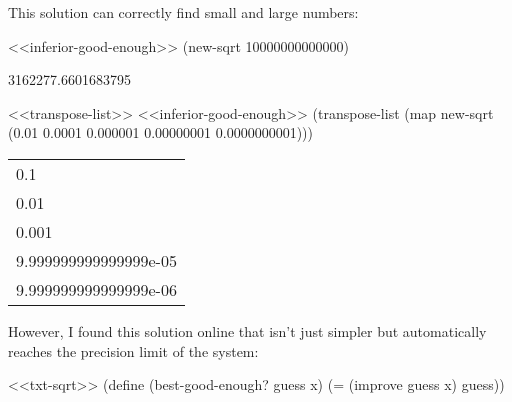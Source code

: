 \documentclass[
]{article}
\newenvironment{Shaded}{}{}
\newcommand{\DecValTok}[1]{\textcolor[rgb]{0.25,0.63,0.44}{#1}}
\newcommand{\ExtensionTok}[1]{#1}
\newcommand{\FloatTok}[1]{\textcolor[rgb]{0.25,0.63,0.44}{#1}}
\newcommand{\FunctionTok}[1]{\textcolor[rgb]{0.02,0.16,0.49}{#1}}
\newcommand{\NormalTok}[1]{#1}
\newcommand{\OperatorTok}[1]{\textcolor[rgb]{0.40,0.40,0.40}{#1}}
\begin{document}
This solution can correctly find small and large numbers:

\begin{Shaded}
\begin{Highlighting}[]
\NormalTok{\textless{}\textless{}inferior{-}good{-}enough\textgreater{}\textgreater{}}
\NormalTok{(new{-}sqrt }\DecValTok{10000000000000}\NormalTok{)}
\end{Highlighting}
\end{Shaded}

3162277.6601683795

\hypertarget{EX1-7-t2}{%
\label{EX1-7-t2}}%
\begin{Shaded}
\begin{Highlighting}[]
\NormalTok{\textless{}\textless{}transpose{-}list\textgreater{}\textgreater{}}
\NormalTok{\textless{}\textless{}inferior{-}good{-}enough\textgreater{}\textgreater{}}
\NormalTok{(transpose{-}list (map new{-}sqrt \textquotesingle{}(}\FloatTok{0.01} \FloatTok{0.0001} \FloatTok{0.000001} \FloatTok{0.00000001} \FloatTok{0.0000000001}\NormalTok{)))}
\end{Highlighting}
\end{Shaded}

\begin{longtable}[]{@{}l@{}}
\toprule
\endhead
0.1 \\
0.01 \\
0.001 \\
9.999999999999999e-05 \\
9.999999999999999e-06 \\
\bottomrule
\end{longtable}

However, I found this solution online that isn't just simpler but
automatically reaches the precision limit of the system:

\hypertarget{new-good-enough}{%
\label{new-good-enough}}%
\begin{Shaded}
\begin{Highlighting}[]
\NormalTok{\textless{}\textless{}txt{-}sqrt\textgreater{}\textgreater{}}
\NormalTok{(}\ExtensionTok{define}\FunctionTok{ }\NormalTok{(best{-}good{-}enough? guess x)}
\NormalTok{   (}\OperatorTok{=}\NormalTok{ (improve guess x) guess))}
\end{Highlighting}
\end{Shaded}
\end{document}
